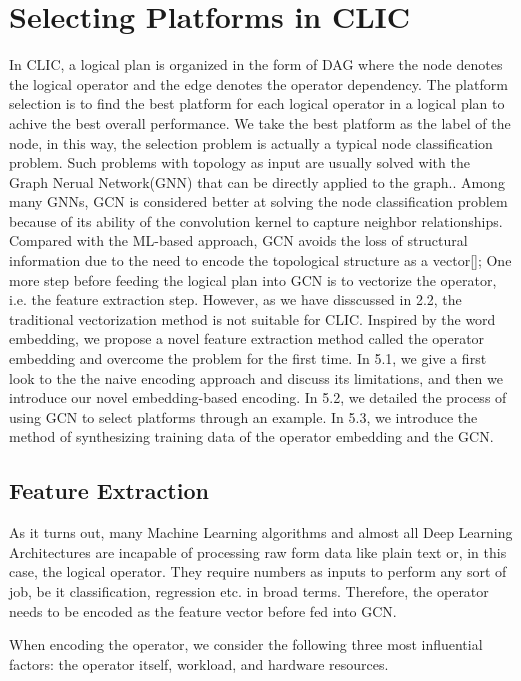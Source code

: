 
\section{Selecting Platforms in CLIC}


In CLIC, a logical plan is organized in the form of DAG where the node denotes the logical operator and the edge denotes the operator dependency.
The platform selection is to find the best platform for each logical operator in a logical plan to achive the best overall performance.
We take the best platform as the label of the node, in this way, the selection problem is actually a typical node classification problem.
Such problems with topology as input are usually solved with the Graph Nerual Network(GNN) that can be directly applied to the graph.. 
Among many GNNs, GCN is considered better at solving the node classification problem because of its ability of the convolution kernel to capture neighbor relationships.
Compared with the ML-based approach, GCN avoids the loss of structural information due to the need to encode the topological structure as a vector[];
One more step before feeding the logical plan into GCN is to vectorize the operator, i.e. the feature extraction step.
However, as we have disscussed in 2.2, the traditional vectorization method is not suitable for CLIC. 
Inspired by the word embedding, we propose a novel feature extraction method called the operator embedding and overcome the problem for the first time.
In 5.1, we give a first look to the the naive encoding approach and discuss its limitations, and then we introduce our novel embedding-based encoding.
In 5.2, we detailed the process of using GCN to select platforms through an example.
In 5.3, we introduce the method of synthesizing training data of the operator embedding and the GCN.

\subsection{Feature Extraction}
As it turns out, many Machine Learning algorithms and almost all Deep Learning Architectures are incapable of processing raw form data like plain text or, in this case, the logical operator. 
They require numbers as inputs to perform any sort of job, be it classification, regression etc. in broad terms. 
Therefore, the operator needs to be encoded as the feature vector before fed into GCN.

When encoding the operator, we consider the following three most influential factors: the operator itself, workload, and hardware resources.

